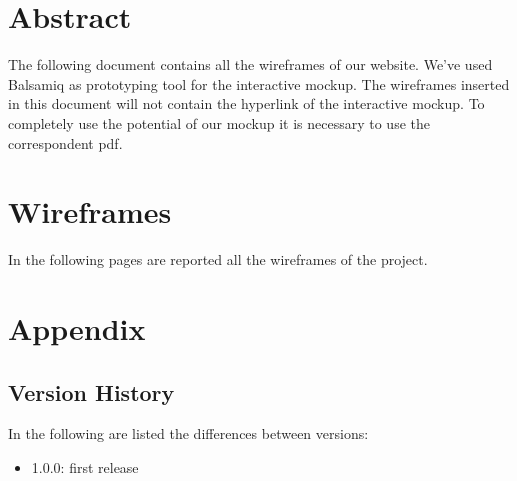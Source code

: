 \documentclass{../Common/Structure/doc_pdf}
\begin{document}
\titleToc

\chapter{Abstract}
\thispagestyle{fancy}
The following document contains all the wireframes of our website. We've used Balsamiq as prototyping tool for the interactive mockup. The wireframes inserted in this document will not contain the hyperlink of the interactive mockup. To completely use the potential of our mockup it is necessary to use the correspondent pdf.

\chapter{Wireframes}
\thispagestyle{fancy}
In the following pages are reported all the wireframes of the project.


\appendix
\chapter{Appendix}
\section{Version History}
In the following are listed the differences between versions:
\begin{itemize}
	\item 1.0.0: first release
\end{itemize}
\end{document}
